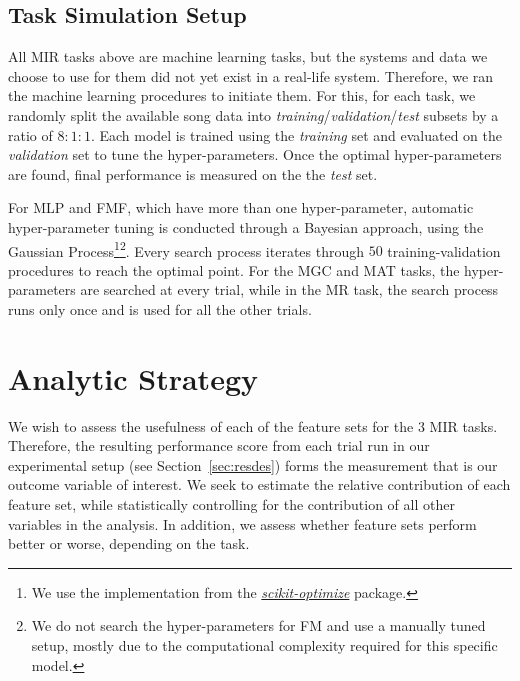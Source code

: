 \documentclass{article}
\begin{document}
\subsection{Task Simulation Setup}\label{sec:exp:task:setup}
All MIR tasks above are machine learning tasks, but the systems and data we choose to use for them did not yet exist in a real-life system. Therefore, we ran the machine learning procedures to initiate them. For this, for each task, we randomly split the available song data into \textit{training}/\textit{validation}/\textit{test} subsets by a ratio of $8:1:1$. Each model is trained using the \textit{training} set and evaluated on the \textit{validation} set to tune the hyper-parameters. Once the optimal hyper-parameters are found, final performance is measured on the the \textit{test} set.

For MLP and FMF, which have more than one hyper-parameter, automatic hyper-parameter tuning is conducted through a Bayesian approach, using the Gaussian Process\footnote{We use the implementation from the \href{https://scikit-optimize.github.io/stable/index.html}{\emph{scikit-optimize}} package.}\footnote{We do not search the hyper-parameters for FM and use a manually tuned setup, mostly due to the computational complexity required for this specific model.}. Every search process iterates through $50$ training-validation procedures to reach the optimal point. For the MGC and MAT tasks, the hyper-parameters are searched at every trial, while in the MR task, the search process runs only once and is used for all the other trials.


\section{Analytic Strategy}\label{sec:analysis}

We wish to assess the usefulness of each of the feature sets for the 3 MIR tasks. Therefore, the resulting performance score from each trial run in our experimental setup (see Section~\ref{sec:resdes}) forms the measurement that is our outcome variable of interest. %
We seek to estimate the relative contribution of each feature set, while statistically controlling for the contribution of all other variables in the analysis. In addition, we assess whether feature sets perform better or worse, depending on the task.
\end{document}

